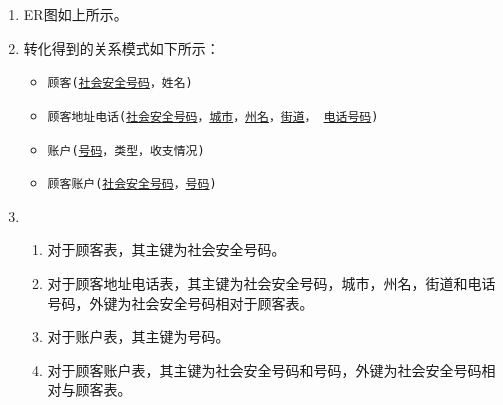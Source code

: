 \documentclass[10pt,a4paper]{article}
\begin{document}
	\begin{enumerate} 
		\item ER图如上所示。
		\item 转化得到的关系模式如下所示：
		\begin{itemize}
			\item \texttt{顾客(\underline{社会安全号码}，姓名)}
			\item \texttt{顾客地址电话(\underline{社会安全号码}，\underline{城市}，\underline{州名}，\underline{街道}， \underline{电话号码})}
			\item \texttt{账户(\underline{号码}，类型，收支情况)}
			\item \texttt{顾客账户(\underline{社会安全号码}，\underline{号码})}
		\end{itemize}
		\item \begin{enumerate}
			\item 对于顾客表，其主键为社会安全号码。
			\item 对于顾客地址电话表，其主键为社会安全号码，城市，州名，街道和电话号码，外键为社会安全号码相对于顾客表。
			\item 对于账户表，其主键为号码。
			\item 对于顾客账户表，其主键为社会安全号码和号码，外键为社会安全号码相对与顾客表。
		\end{enumerate}
	\end{enumerate}
	\newpage
\end{document}
